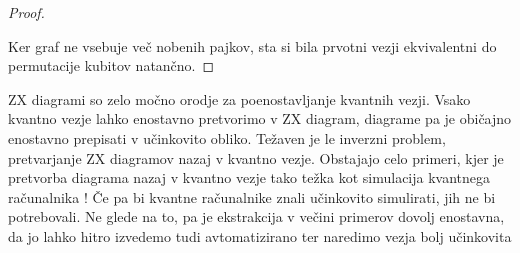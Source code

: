 \documentclass[mat1]{fmfdelo}
\begin{document}
\begin{proof}
\begin{center}
    \end{center}
    Ker graf ne vsebuje več nobenih pajkov, sta si bila prvotni vezji ekvivalentni do permutacije kubitov natančno.
\end{proof}
ZX diagrami so zelo močno orodje za poenostavljanje kvantnih vezji. Vsako kvantno vezje lahko enostavno pretvorimo v ZX diagram, diagrame pa je običajno enostavno prepisati v učinkovito obliko. Težaven je le inverzni problem, pretvarjanje ZX diagramov nazaj v kvantno vezje. Obstajajo celo primeri, kjer je pretvorba diagrama nazaj v kvantno vezje tako težka kot simulacija kvantnega računalnika \cite{Niel}! Če pa bi kvantne računalnike znali učinkovito simulirati, jih ne bi potrebovali. Ne glede na to, pa je ekstrakcija v večini primerov dovolj enostavna, da jo lahko hitro izvedemo tudi avtomatizirano ter naredimo vezja bolj učinkovita
\end{document}

